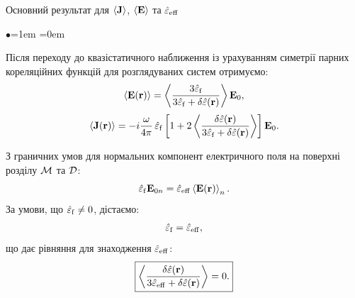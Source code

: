 \documentclass[10pt]{beamer}
\begin{document}
\begin{frame}{Основний результат для $\langle {\bf J} \rangle$, $\langle {\bf E} \rangle$ та  $\hat{\varepsilon}_{\rm eff}$}
\footnotesize

\begin{list}{$\bullet$}{\leftmargin=1em \itemindent=0em}

\item
Після переходу до квазістатичного наближення із урахуванням симетрії парних кореляційних функцій для розглядуваних систем отримуємо:
\begin{equation}\label{eq:Eaveraged}
\langle \mathbf{E} (\mathbf{r}) \rangle = \left\langle \frac{ 3
\hat{\varepsilon}_{\rm f}  }{3 \hat{\varepsilon}_{\rm f}
+ \delta\hat{\varepsilon}({\bf r})} \right\rangle \mathbf{E}_0 ,
\end{equation}
\begin{equation}\label{eq:Caveraged}
\langle \mathbf{J}  (\mathbf{r}) \rangle = -i \frac{\omega}{4\pi}
\, \hat{\varepsilon}_{\rm f}\left[1+ 2\left\langle \frac{
\delta\hat{\varepsilon}({\bf r}) }{3 \hat{\varepsilon}_{\rm f}
+ \delta\hat{\varepsilon}({\bf r})} \right\rangle \right] \mathbf{E}_0.
\end{equation}

\item
З граничних умов для нормальних компонент електричного поля на поверхні розділу $\cal{M}$ та $\cal{D}$:
\begin{equation} \label{eq:boundarycondition}
\hat{\varepsilon}_{\rm
f} {\mathbf{E}}_{0n} = \hat{\varepsilon}_{\rm eff}
\left\langle{\mathbf{E}}({\mathbf{r}})\right\rangle_n.
\end{equation}
За умови, що $\hat{\varepsilon}_{\rm f} \neq 0$, дістаємо:
\begin{equation} \label{eq:ef} 
\hat{ \varepsilon}_{\rm f} = \hat{ \varepsilon}_{\rm eff},
\end{equation}
що дає рівняння для знаходження $\hat{\varepsilon}_{\rm eff}$:
\begin{equation} \label{eq:equation}
\boxed{
\left\langle \frac{\delta\hat{\varepsilon}({\bf r}) }{3 \hat{\varepsilon}_{\rm eff} + \delta\hat{\varepsilon}({\bf r})} \right\rangle = 0.
}
\end{equation}


\end{list}

\end{frame}
\end{document}
